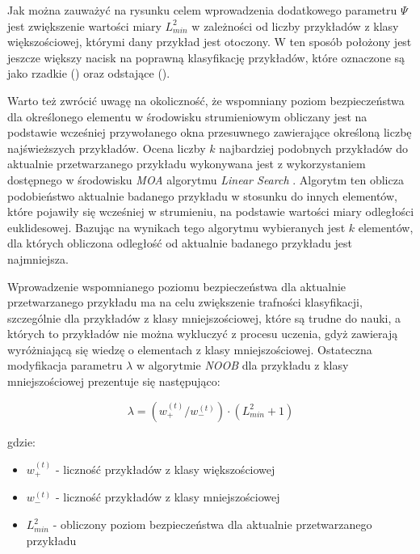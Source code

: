 \noindent Jak można zauważyć na rysunku celem wprowadzenia dodatkowego parametru $\Psi$ jest zwiększenie wartości miary $L^2_{min}$ w zależności od liczby przykładów z klasy większościowej, którymi dany przykład jest otoczony. W ten sposób położony jest jeszcze większy nacisk na poprawną klasyfikację przykładów, które oznaczone są jako rzadkie () oraz odstające (). 

Warto też zwrócić uwagę na okoliczność, że wspomniany poziom bezpieczeństwa dla określonego elementu w środowisku strumieniowym obliczany jest na podstawie wcześniej przywołanego okna przesuwnego zawierające określoną liczbę najświeższych przykładów. Ocena liczby $k$ najbardziej podobnych przykładów do aktualnie przetwarzanego przykładu wykonywana jest z wykorzystaniem dostępnego w środowisku \textit{MOA} algorytmu \textit{Linear Search} \cite{Article:LinearSearch}. Algorytm ten oblicza podobieństwo aktualnie badanego przykładu w stosunku do innych elementów, które pojawiły się wcześniej w strumieniu, na podstawie wartości miary odległości euklidesowej. Bazując na wynikach tego algorytmu wybieranych jest $k$ elementów, dla których obliczona odległość od aktualnie badanego przykładu jest najmniejsza.

Wprowadzenie wspomnianego poziomu bezpieczeństwa dla aktualnie przetwarzanego przykładu ma na celu zwiększenie trafności klasyfikacji, szczególnie dla przykładów z klasy mniejszościowej, które są trudne do nauki, a których to przykładów nie można wykluczyć z procesu uczenia, gdyż zawierają wyróżniającą się wiedzę o elementach z klasy mniejszościowej. Ostateczna modyfikacja parametru $\lambda$ w algorytmie \textit{NOOB} dla przykładu z klasy mniejszościowej prezentuje się następująco:

\begin{equation}
    \lambda = (w^{(t)}_{+}/w^{(t)}_{-}) \cdot (L^2_{min} + 1)
\end{equation}

\noindent gdzie:

\begin{itemize}
    \item $w^{(t)}_{+}$ - liczność przykładów z klasy większościowej
    \item $w^{(t)}_{-}$ - liczność przykładów z klasy mniejszościowej
    \item $L^2_{min}$ - obliczony poziom bezpieczeństwa dla aktualnie przetwarzanego przykładu
\end{itemize}

